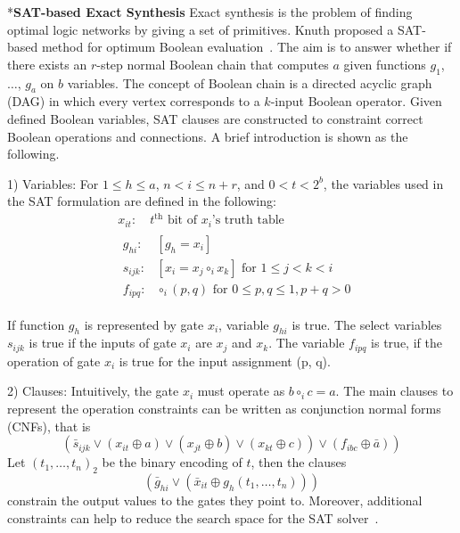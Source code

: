 \documentclass[conference,letterpaper]{IEEEtran}
\makeatletter
\renewcommand{\subsection}{\@startsection{subsection}{1}{0mm}
	{-\baselineskip}{0.001\baselineskip}{\bf\leftline}}
\makeatother
\begin{document}
\subsection*{\textbf{SAT-based Exact Synthesis}}
Exact synthesis is the problem of finding optimal logic networks by giving a set of primitives.
Knuth proposed a SAT-based method for optimum Boolean evaluation~\cite{knuth}. 
The aim is to answer whether if there exists an $r$-step normal Boolean chain that computes $a$ given functions $g_1$, $\ldots$, $g_a$ on $b$ variables. The concept of Boolean chain is a directed acyclic graph (DAG) in which every vertex corresponds to a $k$-input Boolean operator. 
Given defined Boolean variables, SAT clauses are constructed to constraint correct Boolean operations and connections.
A brief introduction is shown as the following. 

1) Variables: For $1 \leq h \leq a$, $n<i \leq n+r$, and $0<t<2^{b}$, the variables used in the SAT formulation are defined in the following:
\begin{equation}
\begin{aligned}
&x_{i t}: \quad t^{\mathrm{th}} \text { bit of } x_{i} \text{'s truth table }\\
&\begin{aligned}
g_{h i}: &\left[g_{h}=x_{i}\right] \\
s_{i j k}: &\left[x_{i}=x_{j} \circ_{i} x_{k}\right] \text { for } 1 \leq j<k<i \\
f_{i p q}: & \circ_{i}(p, q) \text { for } 0 \leq p, q \leq 1, p+q>0
\end{aligned}
\end{aligned}
\end{equation}

If function $g_{h}$ is represented by gate $x_{i}$, variable $g_{hi}$ is true. The select variables $s_{ijk}$ is true if the inputs of gate $x_{i}$ are $x_{j}$ and $x_{k}$. The variable $f_{ipq}$ is true, if the operation of gate $x_{i}$ is true for the input assignment (p, q).

2) Clauses: Intuitively, the gate $x_{i}$ must operate as $b \circ_{i} c=a$.  The main clauses to represent the operation constraints can be written as conjunction normal forms (CNFs), that is
\begin{equation}
\left.\left(\bar{s}_{i j k} \vee\left(x_{i t} \oplus a\right) \vee\left(x_{j t} \oplus b\right) \vee\left(x_{k t} \oplus c\right)\right) \vee\left(f_{i b c} \oplus \bar{a}\right)\right)
\end{equation}
Let $\left(t_{1}, \ldots, t_{n}\right)_{2}$ be the binary encoding of $t$, then the clauses
\begin{equation}
\left(\bar{g}_{h i} \vee\left(\bar{x}_{i t} \oplus g_{h}\left(t_{1}, \ldots, t_{n}\right)\right)\right)
\end{equation}
constrain the output values to the gates they point to. Moreover, additional constraints can help to reduce the search space for the SAT solver~\cite{knuth}. %
\end{document}
